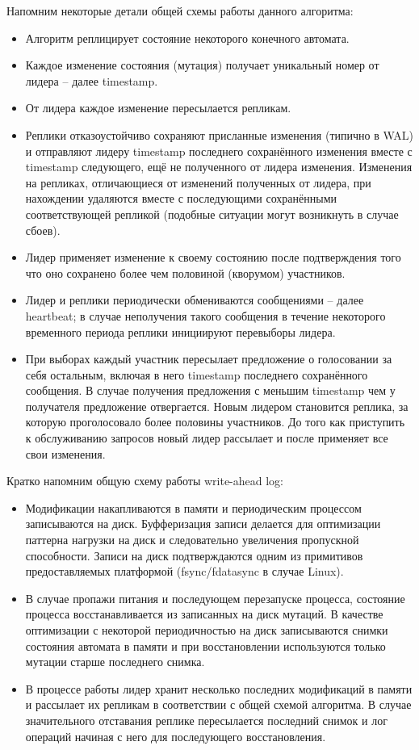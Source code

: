 \documentclass[pdftex,ptm,12pt,a4paper]{report}
\theoremstyle{definition}
\begin{document}
\label{baseline}
Напомним некоторые детали общей схемы работы данного алгоритма:
\begin{itemize}
    \item Алгоритм реплицирует состояние некоторого конечного автомата.
    \item Каждое изменение состояния (мутация) получает уникальный номер от лидера -- далее timestamp.
    \item От лидера каждое изменение пересылается репликам.
    \item Реплики отказоустойчиво сохраняют присланные изменения (типично в WAL)
        и отправляют лидеру timestamp последнего сохранённого изменения вместе с timestamp следующего, ещё не
        полученного от лидера изменения. Изменения на репликах, отличающиеся от изменений полученных от лидера, при нахождении удаляются вместе
        с последующими сохранёнными соответствующей репликой (подобные ситуации могут возникнуть в случае сбоев).
    \item Лидер применяет изменение к своему состоянию после подтверждения того что оно сохранено более чем половиной (кворумом) участников.
    \item Лидер и реплики периодически обмениваются сообщениями -- далее heartbeat; в случае неполучения такого сообщения в течение некоторого временного периода реплики инициируют перевыборы лидера.
    \item При выборах каждый участник пересылает предложение о голосовании за себя остальным, включая в него timestamp последнего сохранённого сообщения. В случае получения предложения с меньшим
    timestamp чем у получателя предложение отвергается. Новым лидером становится реплика, за которую проголосовало более половины участников. До того как приступить к обслуживанию
    запросов новый лидер рассылает и после применяет все свои изменения.
\end{itemize}

Кратко напомним общую схему работы write-ahead log:
\begin{itemize}
    \item Модификации накапливаются в памяти и периодическим процессом записываются на диск.
        Буфферизация записи делается для оптимизации паттерна нагрузки на диск и следовательно увеличения пропускной способности.
        Записи на диск подтверждаются одним из примитивов предоставляемых платформой (fsync/fdatasync в случае Linux).
    \item В случае пропажи питания и последующем перезапуске процесса, состояние процесса восстанавливается из записанных на диск мутаций. В качестве оптимизации
        с некоторой периодичностью на диск записываются снимки состояния автомата в памяти и при восстановлении используются только мутации старше последнего снимка.
    \item В процессе работы лидер хранит несколько последних модификаций в памяти и рассылает их репликам в соответствии с общей схемой алгоритма.
        В случае значительного отставания реплике пересылается последний снимок и лог операций начиная с него для последующего восстановления.
\end{itemize}
\end{document}
